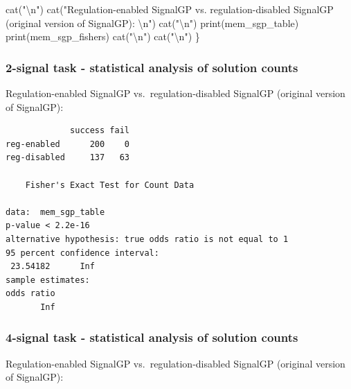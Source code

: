 \documentclass[
]{book}
\newenvironment{Shaded}{\begin{snugshade}}{\end{snugshade}}
\newcommand{\FunctionTok}[1]{\textcolor[rgb]{0.00,0.00,0.00}{#1}}
\newcommand{\NormalTok}[1]{#1}
\newcommand{\SpecialCharTok}[1]{\textcolor[rgb]{0.00,0.00,0.00}{#1}}
\newcommand{\StringTok}[1]{\textcolor[rgb]{0.31,0.60,0.02}{#1}}
\begin{document}
\begin{Shaded}
\begin{Highlighting}[]
  \FunctionTok{cat}\NormalTok{(}\StringTok{"}\SpecialCharTok{\textbackslash{}n}\StringTok{"}\NormalTok{)}
  \FunctionTok{cat}\NormalTok{(}\StringTok{"Regulation{-}enabled SignalGP vs. regulation{-}disabled SignalGP (original version of SignalGP):  }\SpecialCharTok{\textbackslash{}n}\StringTok{"}\NormalTok{)}
  \FunctionTok{cat}\NormalTok{(}\StringTok{"\textasciigrave{}\textasciigrave{}\textasciigrave{}}\SpecialCharTok{\textbackslash{}n}\StringTok{"}\NormalTok{)}
  \FunctionTok{print}\NormalTok{(mem\_sgp\_table)}
  \FunctionTok{print}\NormalTok{(mem\_sgp\_fishers)}
  \FunctionTok{cat}\NormalTok{(}\StringTok{"\textasciigrave{}\textasciigrave{}\textasciigrave{}}\SpecialCharTok{\textbackslash{}n}\StringTok{"}\NormalTok{)}
  \FunctionTok{cat}\NormalTok{(}\StringTok{"}\SpecialCharTok{\textbackslash{}n}\StringTok{"}\NormalTok{)}
\NormalTok{\}}
\end{Highlighting}
\end{Shaded}

\hypertarget{signal-task---statistical-analysis-of-solution-counts}{%
\subsubsection{2-signal task - statistical analysis of solution counts}\label{signal-task---statistical-analysis-of-solution-counts}}

Regulation-enabled SignalGP vs.~regulation-disabled SignalGP (original version of SignalGP):

\begin{verbatim}
             success fail
reg-enabled      200    0
reg-disabled     137   63

    Fisher's Exact Test for Count Data

data:  mem_sgp_table
p-value < 2.2e-16
alternative hypothesis: true odds ratio is not equal to 1
95 percent confidence interval:
 23.54182      Inf
sample estimates:
odds ratio 
       Inf 
\end{verbatim}

\hypertarget{signal-task---statistical-analysis-of-solution-counts-1}{%
\subsubsection{4-signal task - statistical analysis of solution counts}\label{signal-task---statistical-analysis-of-solution-counts-1}}

Regulation-enabled SignalGP vs.~regulation-disabled SignalGP (original version of SignalGP):
\end{document}
